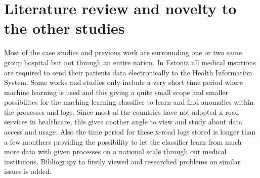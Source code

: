 \documentclass[12pt]{article}
\begin{document}
\section{Literature review and novelty to the other studies}
Most of the case studies and previous work are surrounding one or two same group hospital but not through an entire nation. In Estonia all medical institions are required to send their patients data electronically to the Health Information System. Some works and studies only include a very short time period where machine learning is used and this giving a quite small scope and smaller possibilites for the maching learning classifier to learn and find anomalies within the processes and logs. 
Since most of the countries have not adopted x-road services in healthcare, this gives another angle to view and study about data access and usage. Also the time period for these x-road logs stored is longer than a few monthers providing the possibility to let the classifier learn from much more data with given processes on a national scale through out medical instituions.
Bibliograpy to firstly viewed and researched problems on similar issues is added. 
\end{document}
